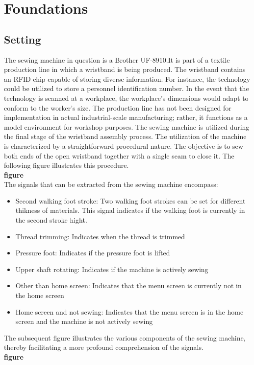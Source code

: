 \clearpage
\chapter{\textbf{Foundations}}\label{grundlagen}
\section{Setting}
The sewing machine in question is a Brother UF-8910.It is part of a textile production line in which a wristband is being produced. The wristband contains an RFID chip capable of storing diverse information. For instance, the technology could be utilized to store a personnel identification number. In the event that the technology is scanned at a workplace, the workplace's dimensions would adapt to conform to the worker's size. The production line has not been designed for implementation in actual industrial-scale manufacturing; rather, it functions as a model environment for workshop purposes. The sewing machine is utilized during the final stage of the wristband assembly process. The utilization of the machine is characterized by a straightforward procedural nature. The objective is to sew both ends of the open wristband together with a single seam to close it. The following figure illustrates this procedure.\\
\textbf{figure}
\\

The signals that can be extracted from the sewing machine encompass:
\begin{itemize}
	\item Second walking foot stroke: Two walking foot strokes can be set for different thikness of materials. This signal indicates if the walking foot is currently in the second stroke hight.
	\item Thread trimming: Indicates when the thread is trimmed
	\item Pressure foot: Indicates if the pressure foot is lifted
	\item Upper shaft rotating: Indicates if the machine is actively sewing
	\item Other than home screen: Indicates that the menu screen is currently not in the home screen
	\item Home screen and not sewing: Indicates that the menu screen is in the home screen and the machine is not actively sewing
\end{itemize}
The subsequent figure illustrates the various components of the sewing machine, thereby facilitating a more profound comprehension of the signals.\\
\textbf{figure}
